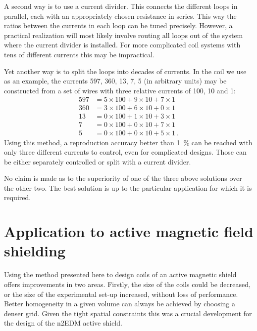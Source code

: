 A second way is to use a current divider.
This connects the different loops in parallel, each with an appropriately chosen resistance in series.
This way the ratios between the currents in each loop can be tuned precisely.
However, a practical realization will most likely involve routing all loops out of the system where the current divider is installed.
For more complicated coil systems with tens of different currents this may be impractical.

Yet another way is to split the loops into decades of currents.
In the coil we use as an example, the currents \num{597}, \num{360}, \num{13}, \num{7}, \num{5} (in arbitrary units) may be constructed from a set of wires with three relative currents of \num{100}, \num{10} and \num{1}:
\begin{align*}
  597 & = 5 \times 100 + 9 \times 10 + 7 \times 1 \\
  360 & = 3 \times 100 + 6 \times 10 + 0 \times 1 \\
  13 & = 0 \times 100 + 1 \times 10 + 3 \times 1 \\
  7 & = 0 \times 100 + 0 \times 10 + 7 \times 1 \\
  5 & = 0 \times 100 + 0 \times 10 + 5 \times 1 \ .
\end{align*}
Using this method, a reproduction accuracy better than \SI{1}{\percent} can be reached with only three different currents to control, even for complicated designs.
Those can be either separately controlled or split with a current divider.

No claim is made as to the superiority of one of the three above solutions over the other two.
The best solution is up to the particular application for which it is required.




\section{Application to active magnetic field shielding}
Using the method presented here to design coils of an active magnetic shield  offers improvements in two areas.
Firstly, the size of the coils could be decreased, or the size of the experimental set-up increased, without loss of performance.
Better homogeneity in a given volume can always be achieved by choosing a denser grid.
Given the tight spatial constraints this was a crucial development for the design of the n2EDM active shield.

